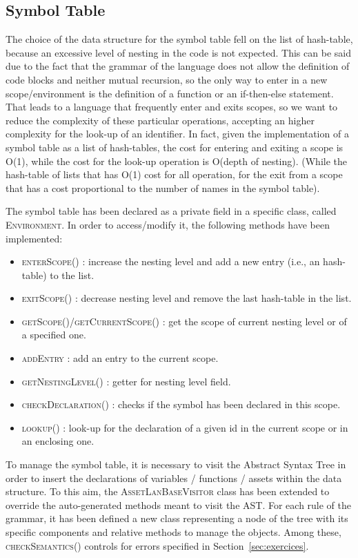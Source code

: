 \documentclass[11pt]{article} %
\begin{document}
\subsection{Symbol Table}
The choice of the data structure for the symbol table fell on the list of hash-table, because an excessive level of nesting in the code is not expected. This can be said due to the fact that the grammar of the language does not allow the definition of code blocks and neither mutual recursion, so the only way to enter in a new scope/environment is the definition of a function or an if-then-else statement. That leads to a language that frequently enter and exits scopes, so we want to reduce the complexity of these particular operations, accepting an higher complexity for the look-up of an identifier. In fact, given the implementation of a symbol table as a list of hash-tables, the cost for entering and exiting a scope is O(1), while the cost for the look-up operation is O(depth of nesting). (While the hash-table of lists that has O(1) cost for all operation, for the exit from a scope that has a cost proportional to the number of names in the symbol table). 

\medskip

The symbol table has been declared as a private field in a specific class, called \textsc{Environment}. In order to access/modify it, the following methods have been implemented:
\begin{itemize}
\item \textsc{enterScope()} : increase the nesting level and add a new entry (i.e., an hash-table) to the list. 
\item \textsc{exitScope()} : decrease nesting level and remove the last hash-table in the list.
\item \textsc{getScope()}/\textsc{getCurrentScope()} : get the scope of current nesting level or of a specified one.
\item \textsc{addEntry} : add an entry to the current scope.
\item \textsc{getNestingLevel()} : getter for nesting level field.
\item \textsc{checkDeclaration()} : checks if the symbol has been declared in this scope. 
\item \textsc{lookup()} : look-up for the declaration of a given id in the current scope or in an enclosing one. 
\end{itemize}

\medskip

To manage the symbol table, it is necessary to visit the Abstract Syntax Tree in order to insert the declarations of variables / functions / assets within the data structure. To this aim, the \textsc{AssetLanBaseVisitor} class has been extended to override the auto-generated methods meant to visit the AST. For each rule of the grammar, it has been defined a new class representing a node of the tree with its specific components and relative methods to manage the objects. Among these, \textsc{checkSemantics()} controls for errors specified in Section~\ref{sec:exercices}.
\end{document}
